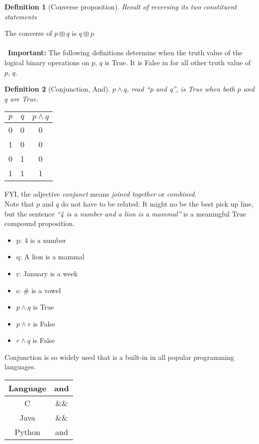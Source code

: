\documentclass[10pt,a4paper,draft,titlepage,onecolumn]{book}
\newtheorem{definition}{Definition}[section]
\begin{document}
\begin{definition}[Converse proposition] Result of reversing its two constituent statements
\end{definition}
The converse of  $p{\boxplus}q$  is  $q{\boxplus}p$ \\ \\\
\textbf{Important:} The following definitions determine when the truth value of the logical binary operations on $p$, $q$ is True. It is False in for all other truth value of $p$, $q$.
\begin{definition}[Conjunction, And] $p{\wedge}q$, read ``p and q'', is True when both $p$ and $q$ are True.
\end{definition} 
\begin{center}
\begin{tabular}{ |c|c|c| }
 \hline
 $p$ & $q$ &  $p \wedge q$  \\
 \hline
 0 & 0 & 0 \\
 1 & 0 & 0 \\
 0 & 1 & 0 \\
 1 & 1 & 1 \\
 \hline
\end{tabular}
\end{center}
FYI, the adjective \textit{conjunct} means \textit{joined together} or \textit{combined}.\\
Note that $p$ and $q$ do not have to be related: It might no be the best pick up line, but the sentence \textit{``4 is a number and a lion is a mammal''} is a meaningful True compound proposition. \\
\begin{itemize}
\item p: 4 is a number
\item q: A lion is a mammal 
\item r: January is a week
\item s: \# is a vowel
\end{itemize}
\begin{itemize}
\item $p \wedge q$ is True 
\item $p \wedge r$ is False
\item $r \wedge q$ is False
\end{itemize}

Conjunction is so widely used that is a built-in in all popular programming languages.\\
\begin{center}
\begin{tabular}{ |c|c| }
\hline
Language & and \\
\hline
 C      &  \&\& \\
 Java   & \&\& \\
 Python & and    \\
 \hline
\end{tabular}

\end{center}
\end{document}

